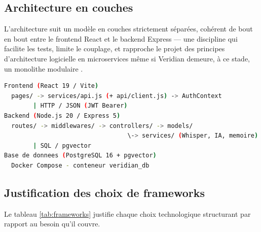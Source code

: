 \documentclass[12pt, a4paper]{article}
\begin{document}
\subsection{Architecture en couches}

L'architecture suit un modèle en couches strictement séparées, cohérent de bout en bout entre le frontend React et le backend Express — une discipline qui facilite les tests, limite le couplage, et rapproche le projet des principes d'architecture logicielle en microservices même si Veridian demeure, à ce stade, un monolithe modulaire \parencite{newman2021microservices}.

\begin{lstlisting}[language=bash, caption={Architecture en couches de Veridian}]
Frontend (React 19 / Vite)
  pages/ -> services/api.js (+ api/client.js) -> AuthContext
        | HTTP / JSON (JWT Bearer)
Backend (Node.js 20 / Express 5)
  routes/ -> middlewares/ -> controllers/ -> models/
                                  \-> services/ (Whisper, IA, memoire)
        | SQL / pgvector
Base de donnees (PostgreSQL 16 + pgvector)
  Docker Compose - conteneur veridian_db
\end{lstlisting}

\subsection{Justification des choix de frameworks}

Le tableau \ref{tab:frameworks} justifie chaque choix technologique structurant par rapport au besoin qu'il couvre.
\end{document}
